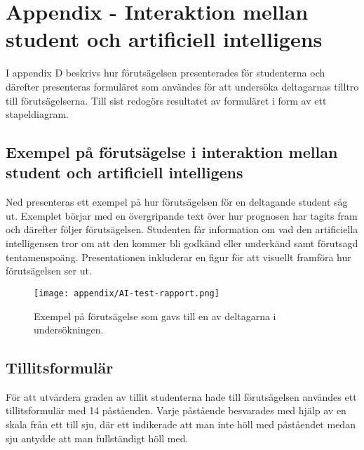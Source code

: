 


\chapter{Appendix - Interaktion mellan student och artificiell intelligens}


I appendix D beskrivs hur förutsägelsen presenterades för studenterna och därefter presenteras formuläret som användes för att undersöka deltagarnas tilltro till förutsägelserna. Till sist redogörs resultatet av formuläret i form av ett stapeldiagram.


\section{Exempel på förutsägelse i interaktion mellan student och artificiell intelligens}
\label{app:AI-test-figur}
Ned presenteras ett exempel på hur förutsägelsen för en deltagande student såg ut. Exemplet börjar med en övergripande text över hur prognosen har tagits fram och därefter följer förutsägelsen. Studenten får information om vad den artificiella intelligensen tror om att den kommer bli godkänd eller underkänd samt förutsagd tentamenspoäng. Presentationen inkluderar en figur för att visuellt framföra hur förutsägelsen ser ut. 
\begin{figure}[hbtp]
    \centering
    \texttt{[image: appendix/AI-test-rapport.png]}
    \caption{Exempel på förutsägelse som gavs till en av deltagarna i undersökningen.}
    \label{fig:AI-bild}
\end{figure}

\newpage

\section{Tillitsformulär}
\label{app:AI-test}

För att utvärdera graden av tillit studenterna hade till förutsägelsen användes ett tillitsformulär med 14 påståenden. Varje påstående besvarades med hjälp av en skala från ett till sju, där ett indikerade att man inte höll med påståendet medan sju antydde att man fullständigt höll med.





